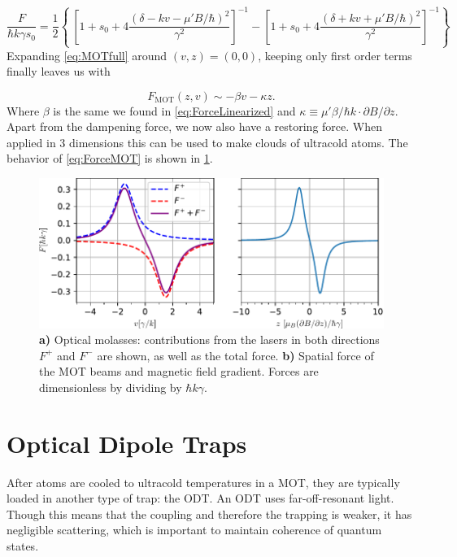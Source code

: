 \begin{equation}\label{eq:MOTfull}
	\frac{F}{\hbar k \gamma s_0} = \frac{1}{2}\left\{\
	\left[1 + s_0 + 4\frac{(\delta - k v - \mu'B / \hbar)^2}{\gamma^2}\right]^{-1}-
	\left[1 + s_0 + 4\frac{(\delta + k v + \mu'B / \hbar)^2}{\gamma^2}\right]^{-1}
	\right\}     
\end{equation}                          
Expanding \cref{eq:MOTfull} around $(v,z) = (0,0)$, keeping only first order terms finally leaves us with \cite{Kowalski2010}

\begin{equation}\label{eq:ForceMOT}
	F_{\text{MOT}}(z,v) \sim -\beta v - \kappa z.
\end{equation}
Where $\beta$ is the same we found in \cref{eq:ForceLinearized} and $\kappa \equiv \mu' \beta /\hbar k \cdot \partial B/\partial z$. 
Apart from the dampening force, we now also have a restoring force. 
When applied in 3 dimensions this can be used to make clouds of ultracold atoms.
The behavior of \cref{eq:ForceMOT} is shown in \cref{fig:SpatialDependencePlots}.

\begin{figure}
    \centering
    \includegraphics[width=0.92\linewidth]{figures/SpatialVelocityDependence.pdf}
    \caption{\textsf{\textbf{a)}} Optical molasses: contributions from the lasers in both directions $F^{+}$ and $F^{-}$ are shown, as well as the total force. \textbf{\textsf{b)}} Spatial force of the MOT beams and magnetic field gradient. Forces are dimensionless by dividing by $\hbar k \gamma$.}
    \label{fig:SpatialDependencePlots}
\end{figure}

\section{Optical Dipole Traps}\label{sec:ODT}

After atoms are cooled to ultracold temperatures in a \ac{MOT}, they are typically loaded in another type of trap: the \ac{ODT}. 
An ODT uses far-off-resonant light. Though this means that the coupling and therefore the trapping is weaker, it has negligible scattering, which is important to maintain coherence of quantum states. 

